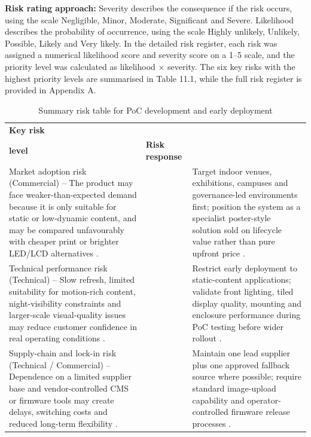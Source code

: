 \documentclass[11pt,a4paper]{article}
\renewcommand{\arraystretch}{1.12}
\begin{document}
\textbf{Risk rating approach:}  Severity describes the consequence if the risk occurs, using the scale Negligible, Minor, Moderate, Significant and Severe. Likelihood describes the probability of occurrence, using the scale Highly unlikely, Unlikely, Possible, Likely and Very likely. In the detailed risk register, each risk was assigned a numerical likelihood score and severity score on a 1–5 scale, and the priority level was calculated as likelihood × severity. The six key risks with the highest priority levels are summarised in Table 11.1, while the full risk register is provided in Appendix A.
\begin{table}[H]
\centering
\caption{Summary risk table for PoC development and early deployment}
\label{tab:summary-risk-table}
\renewcommand{\arraystretch}{1.55}
\setlength{\tabcolsep}{5pt}
\small

\begin{tabularx}{\textwidth}{|>{\centering\arraybackslash}X|>{\centering\arraybackslash}p{1.8cm}|>{\centering\arraybackslash}X|}
\hline
\textbf{\large Key risk} &
\begin{tabular}[c]{@{}c@{}}\textbf{\large Priority}\\\textbf{\large level}\end{tabular} &
\textbf{\large Risk response} \\
\hline

Market adoption risk (Commercial) -- The product may face weaker-than-expected demand because it is only suitable for static or low-dynamic content, and may be compared unfavourably with cheaper print or brighter LED/LCD alternatives \cite{ref6,ref4}.
& 16
& Target indoor venues, exhibitions, campuses and governance-led environments first; position the system as a specialist poster-style solution sold on lifecycle value rather than pure upfront price \cite{ref6,ref4}. \\
\hline

Technical performance risk (Technical) -- Slow refresh, limited suitability for motion-rich content, night-visibility constraints and larger-scale visual-quality issues may reduce customer confidence in real operating conditions \cite{ref2}.
& 20
& Restrict early deployment to static-content applications; validate front lighting, tiled display quality, mounting and enclosure performance during PoC testing before wider rollout \cite{ref2}. \\
\hline

Supply-chain and lock-in risk (Technical / Commercial) -- Dependence on a limited supplier base and vendor-controlled CMS or firmware tools may create delays, switching costs and reduced long-term flexibility \cite{ref14,ref15}.
& 15
& Maintain one lead supplier plus one approved fallback source where possible; require standard image-upload capability and operator-controlled firmware release processes \cite{ref14,ref15}. \\
\hline


\end{tabularx}
\end{table}
\end{document}
